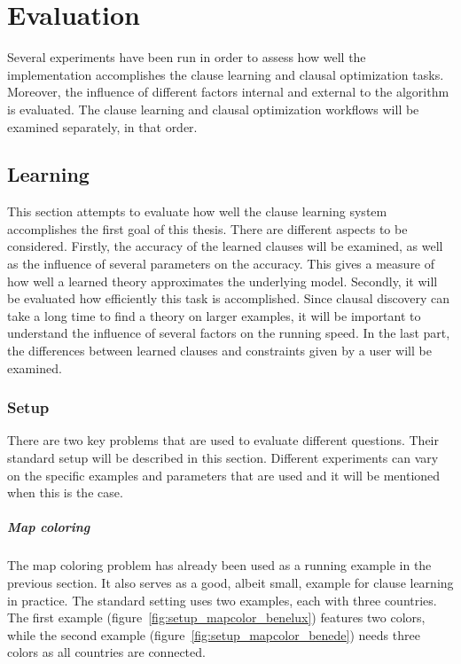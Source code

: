 \chapter{Evaluation}
\label{cha:evaluation}

Several experiments have been run in order to assess how well the implementation accomplishes the clause learning and clausal optimization tasks.
Moreover, the influence of different factors internal and external to the algorithm is evaluated.
The clause learning and clausal optimization workflows will be examined separately, in that order.

\section{Learning}

This section attempts to evaluate how well the clause learning system accomplishes the first goal of this thesis.
There are different aspects to be considered.
Firstly, the accuracy of the learned clauses will be examined, as well as the influence of several parameters on the accuracy.
This gives a measure of how well a learned theory approximates the underlying model.
Secondly, it will be evaluated how efficiently this task is accomplished.
Since clausal discovery can take a long time to find a theory on larger examples, it will be important to understand the influence of several factors on the running speed.
In the last part, the differences between learned clauses and constraints given by a user will be examined.

\subsection{Setup}
There are two key problems that are used to evaluate different questions.
Their standard setup will be described in this section.
Different experiments can vary on the specific examples and parameters that are used and it will be mentioned when this is the case.

\paragraph{Map coloring}
The map coloring problem has already been used as a running example in the previous section.
It also serves as a good, albeit small, example for clause learning in practice.
The standard setting uses two examples, each with three countries.
The first example (figure~\ref{fig:setup_mapcolor_benelux}) features two colors, while the second example (figure~\ref{fig:setup_mapcolor_benede}) needs three colors as all countries are connected.


